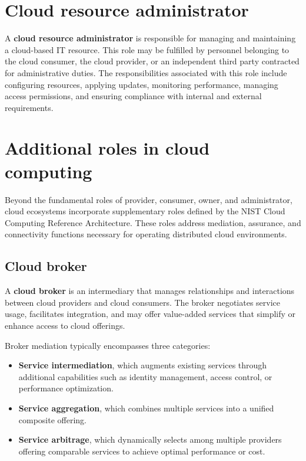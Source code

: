 \documentclass[11pt,a4paper,openany]{report}
\begin{document}
\section{Cloud resource administrator}

A \textbf{cloud resource administrator} is responsible for managing and maintaining a cloud-based IT resource. This role may be fulfilled by personnel belonging to the cloud consumer, the cloud provider, or an independent third party contracted for administrative duties. The responsibilities associated with this role include configuring resources, applying updates, monitoring performance, managing access permissions, and ensuring compliance with internal and external requirements.

\section{Additional roles in cloud computing}

Beyond the fundamental roles of provider, consumer, owner, and administrator, cloud ecosystems incorporate supplementary roles defined by the NIST Cloud Computing Reference Architecture. These roles address mediation, assurance, and connectivity functions necessary for operating distributed cloud environments.

\subsection{Cloud broker}

A \textbf{cloud broker} is an intermediary that manages relationships and interactions between cloud providers and cloud consumers. The broker negotiates service usage, facilitates integration, and may offer value-added services that simplify or enhance access to cloud offerings.

Broker mediation typically encompasses three categories:

\begin{itemize}
\item \textbf{Service intermediation}, which augments existing services through additional capabilities such as identity management, access control, or performance optimization.
\item \textbf{Service aggregation}, which combines multiple services into a unified composite offering.
\item \textbf{Service arbitrage}, which dynamically selects among multiple providers offering comparable services to achieve optimal performance or cost.
\end{itemize}
\end{document}
